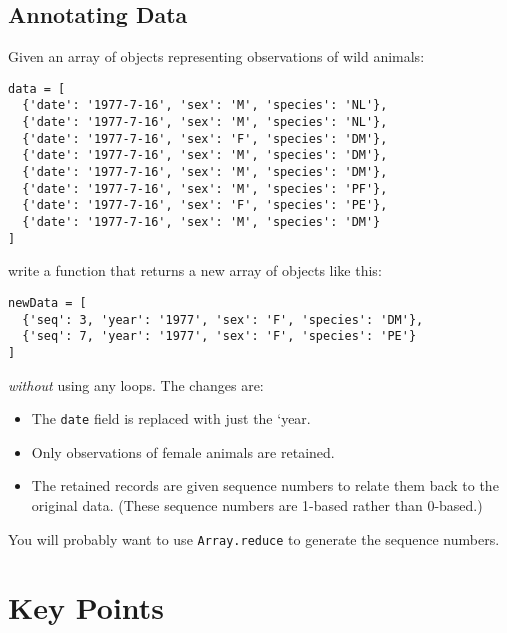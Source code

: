 \subsection*{Annotating Data}
Given an array of objects representing observations of wild animals:

\begin{verbatim}
data = [
  {'date': '1977-7-16', 'sex': 'M', 'species': 'NL'},
  {'date': '1977-7-16', 'sex': 'M', 'species': 'NL'},
  {'date': '1977-7-16', 'sex': 'F', 'species': 'DM'},
  {'date': '1977-7-16', 'sex': 'M', 'species': 'DM'},
  {'date': '1977-7-16', 'sex': 'M', 'species': 'DM'},
  {'date': '1977-7-16', 'sex': 'M', 'species': 'PF'},
  {'date': '1977-7-16', 'sex': 'F', 'species': 'PE'},
  {'date': '1977-7-16', 'sex': 'M', 'species': 'DM'}
]
\end{verbatim}

\noindent
write a function that returns a new array of objects like this:

\begin{verbatim}
newData = [
  {'seq': 3, 'year': '1977', 'sex': 'F', 'species': 'DM'},
  {'seq': 7, 'year': '1977', 'sex': 'F', 'species': 'PE'}
]
\end{verbatim}

\emph{without} using any loops.
The changes are:

\begin{itemize}
\item
  The \texttt{date} field is replaced with just the `year.
\item
  Only observations of female animals are retained.
\item
  The retained records are given sequence numbers to relate them back to the original data.
  (These sequence numbers are 1-based rather than 0-based.)
\end{itemize}

You will probably want to use \texttt{Array.reduce} to generate the sequence numbers.

\section*{Key Points}


